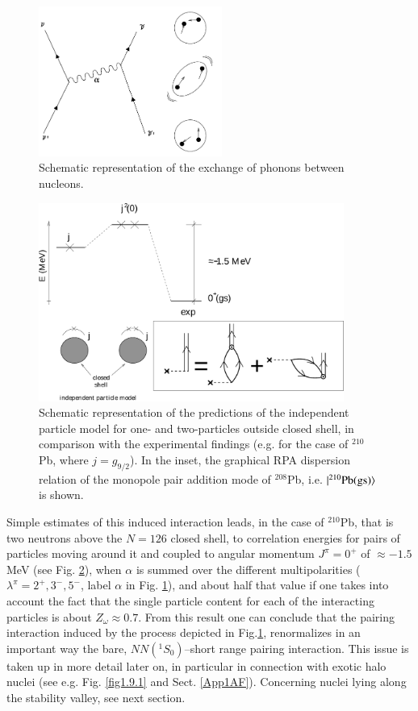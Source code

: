 \begin{figure}
\centerline {
\includegraphics*[width=6cm]{introduccion/figs/figintroD9}
}
\caption{Schematic representation of the exchange of phonons between nucleons.}
\label{fig:4.9}
\end{figure}
\begin{figure}
\centerline {
\includegraphics*[width=10cm]{introduccion/figs/figintroD10}
}
\caption{Schematic representation of the predictions of the independent particle model for one- and two-particles outside closed shell, in comparison with the experimental findings (e.g. for the case of $^{210}$Pb, where $j=g_{9/2}$). In the inset, the graphical RPA dispersion relation of the monopole pair addition mode of $^{208}$Pb, i.e. $|{^{210}\text{Pb(gs)}} \rangle$ is shown.}
\label{fig:4.10}
\end{figure}
Simple estimates of this induced interaction leads, in the case of $^{210}$Pb, that is two neutrons above the $N=126$ closed shell, to correlation energies  for pairs of particles moving around it and coupled to angular momentum $J^{\pi} = 0^+$ of $\approx -1.5$ MeV (see Fig. \ref{fig:4.10}), when $\alpha$ is summed over  the different multipolarities  ($\lambda^{\pi}=2^+,3^-,5^-$, label $\alpha$ in Fig. \ref{fig:4.9}), and about half that value if one takes into account the fact that the single particle content  for each of the interacting particles is about $Z_\omega\approx0.7$. From this result one can conclude that the pairing interaction induced by the process depicted in Fig.\ref{fig:4.9}, renormalizes in an important way the bare, $NN(^1S_0)$--short range pairing interaction. This issue is taken up in more detail later on, in particular in connection with exotic halo nuclei (see e.g. Fig. \ref{fig1.9.1} and Sect. \ref{App1AF}). Concerning nuclei lying along the stability valley, see next section.

